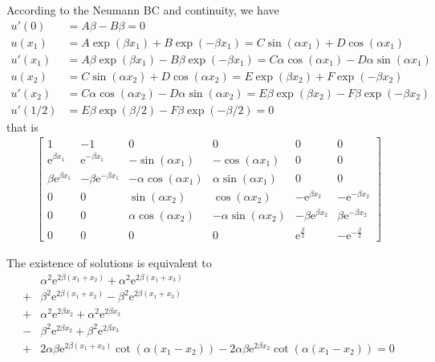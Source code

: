 \documentclass[12pt,a4paper]{article}
\begin{document}
\begin{appendices}
According to the Neumann BC and continuity, we have
\begin{align*}
u'(0) & = A \beta - B \beta = 0 \\
u(x_1) & = A \exp(\beta x_1) + B \exp(-\beta x_1) = C \sin(\alpha x_1) + D \cos(\alpha x_1) \\
u'(x_1) & = A \beta \exp(\beta x_1) - B \beta \exp(-\beta x_1) = C \alpha \cos(\alpha x_1) - D \alpha \sin(\alpha x_1) \\
u(x_2) & = C \sin(\alpha x_2) + D \cos(\alpha x_2) = E \exp(\beta x_2) + F \exp(-\beta x_2) \\
u'(x_2) & = C \alpha \cos(\alpha x_2) - D \alpha \sin(\alpha x_2) = E \beta \exp(\beta x_2) - F \beta \exp(-\beta x_2) \\
u'(1/2) & = E \beta \exp(\beta/2) - F \beta \exp(-\beta/2) = 0
\end{align*}
that is
\begin{align*}
\left[\begin{array}{cccccc} 1 & -1 & 0 & 0 & 0 & 0\\ \mathrm{e}^{\beta x_1} & \mathrm{e}^{- \beta x_1} & - \sin\!\left(\alpha x_1\right) & - \cos\!\left(\alpha x_1\right) & 0 & 0\\ \beta \mathrm{e}^{\beta x_1} & - \beta \mathrm{e}^{- \beta x_1} & - \alpha \cos\!\left(\alpha x_1\right) & \alpha \sin\!\left(\alpha x_1\right) & 0 & 0\\ 0 & 0 & \sin\!\left(\alpha x_2\right) & \cos\!\left(\alpha x_2\right) & - \mathrm{e}^{\beta x_2} & - \mathrm{e}^{- \beta x_2}\\ 0 & 0 & \alpha \cos\!\left(\alpha x_2\right) & - \alpha \sin\!\left(\alpha x_2\right) & - \beta \mathrm{e}^{\beta x_2} & \beta \mathrm{e}^{- \beta x_2}\\ 0 & 0 & 0 & 0 & \mathrm{e}^{\frac{\beta}{2}} & - \mathrm{e}^{-\frac{\beta}{2}} \end{array}\right]
\end{align*}

The existence of solutions is equivalent to
\begin{align*}
& \alpha^2 \mathrm{e}^{2 \beta (x_{1} + x_{2})}  + \alpha^2 \mathrm{e}^{2 \beta (x_{1} + x_{3})} \\
+ & \beta^2 \mathrm{e}^{2 \beta (x_{1} + x_{2})} - \beta^2 \mathrm{e}^{2 \beta (x_{1} + x_{3})} \\
+ & \alpha^2 \mathrm{e}^{2 \beta x_{2}}  + \alpha^2 \mathrm{e}^{2 \beta x_{3}} \\
- & \beta^2 \mathrm{e}^{2 \beta x_{2}} + \beta^2 \mathrm{e}^{2 \beta x_{3}} \\
+ & 2 \alpha \beta \mathrm{e}^{2 \beta (x_{1} + x_{3})} \cot(\alpha (x_{1} - x_{2})) - 2 \alpha \beta \mathrm{e}^{2 \beta x_{2}} \cot(\alpha (x_{1} - x_{2})) = 0
\end{align*}


\end{appendices}
\end{document}
